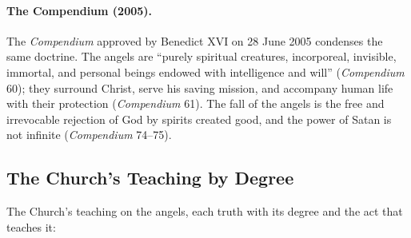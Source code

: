 \paragraph{The Compendium (2005).} The \emph{Compendium} approved by Benedict
XVI on 28 June 2005 condenses the same doctrine. The angels are ``purely
spiritual creatures, incorporeal, invisible, immortal, and personal beings
endowed with intelligence and will'' (\emph{Compendium} 60); they surround
Christ, serve his saving mission, and accompany human life with their
protection (\emph{Compendium} 61). The fall of the angels is the free and
irrevocable rejection of God by spirits created good, and the power of Satan
is not infinite (\emph{Compendium} 74--75).

\sectionguard
\subsection{The Church's Teaching by Degree}

The Church's teaching on the angels, each truth with its degree and the act
that teaches it:

